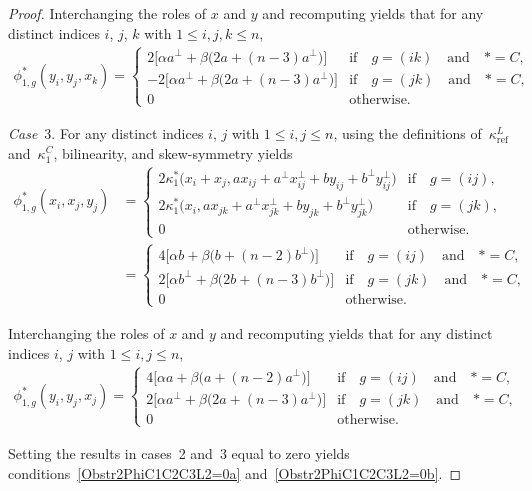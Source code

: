 \documentclass[pdftex]{sigma}
\numberwithin{equation}{section}
\DeclareMathOperator{\refl}{ref}
\begin{document}
\begin{proof}
Interchanging the roles of $x$ and $y$ and recomputing yields that for any
distinct indices $i$, $j$, $k$ with $1 \leq i, j, k \leq n$,
\begin{gather*}
\phi^*_{1,g}(y_i,y_j,x_k)=
\begin{cases}
2\big[\alpha a^\perp + \beta\big(2a+(n-3)a^\perp\big)\big] & \text{if}\quad g=(ik) \quad\text{and}\quad *=C, \\
	 -2\big[\alpha a^\perp + \beta\big(2a+(n-3)a^\perp\big)\big] & \text{if}\quad g=(jk) \quad\text{and}\quad *=C, \\
 0 & \text{otherwise}.
 \end{cases}
\end{gather*}

\textit{Case}~3.
For any distinct indices $i$, $j$ with $1 \leq i, j \leq n$,
using the definitions of~$\kappa^L_{\refl}$ and~$\kappa^C_1$, bilinearity,
and skew-symmetry yields
\begin{align*}
\phi^*_{1,g}(x_i,x_j,y_j)%
&=\begin{cases}
2\kappa^*_1\big(x_i+x_j,ax_{ij}+a^\perp x_{ij}^\perp + by_{ij} + b^\perp y_{ij}^\perp\big) &\text{if}\quad g=(ij), \\
2\kappa^*_1\big(x_i,ax_{jk}+a^\perp x_{jk}^\perp + b y_{jk} + b^\perp y_{jk}^\perp\big) &\text{if}\quad g=(jk), \\
 0 & \text{otherwise}.
\end{cases}
\\
&=\begin{cases}
4\big[\alpha b + \beta\big(b+(n-2)b^\perp\big)\big] & \text{if}\quad g=(ij) \quad\text{and}\quad *=C, \\
2\big[\alpha b^\perp + \beta\big(2b+(n-3)b^\perp\big)\big] & \text{if}\quad g=(jk) \quad\text{and}\quad *=C,
\\
0 & \text{otherwise}.
\end{cases}
\end{align*}

Interchanging the roles of $x$ and $y$ and recomputing yields that for any
distinct indices $i$, $j$ with $1 \leq i, j \leq n$,
\begin{gather*}
\phi^*_{1,g}(y_i,y_j,x_j)=
\begin{cases}
4\big[\alpha a + \beta\big(a+(n-2)a^\perp\big)\big] & \text{if}\quad g=(ij) \quad\text{and}\quad *=C, \\
2\big[\alpha a^\perp + \beta\big(2a+(n-3)a^\perp\big)\big] & \text{if}\quad g=(jk) \quad\text{and}\quad *=C, \\
 0 & \text{otherwise}.
 \end{cases}
\end{gather*}

Setting the results in cases~2 and~3 equal to zero yields
conditions~\eqref{Obstr2PhiC1C2C3L2=0a} and~\eqref{Obstr2PhiC1C2C3L2=0b}.
\end{proof}
\end{document}
